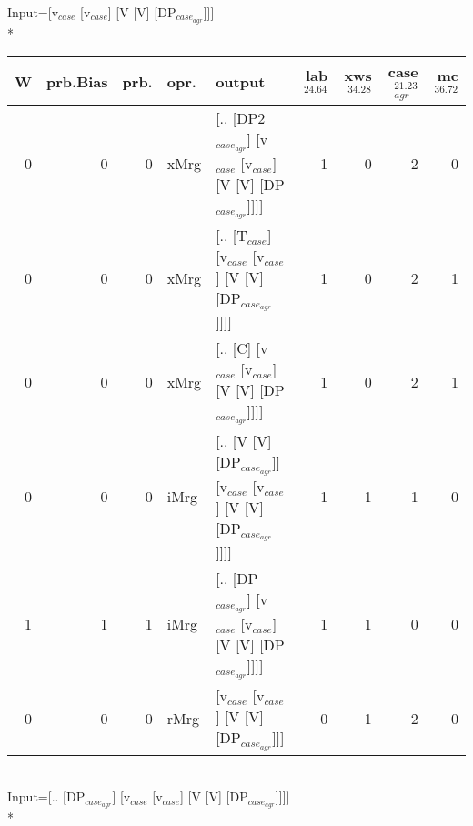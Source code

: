 \begingroup\scriptsize Input=[v$_{case}$ [v$_{case}$] [V [V] [DP$_{case_{agr}}$]]]\\*
\begin{tabularx}{\linewidth}{rrrlXrrrr}
\hline
   W &   prb.Bias &   prb. & opr.   & output                                                             &   lab$^{24.64}$ &   xws$^{34.28}$ &   case$_{agr}^{21.23}$ &   mc$^{36.72}$ \\
\hline
   0 &       0 &   0 & xMrg & [.. [DP2$_{case_{agr}}$] [v$_{case}$ [v$_{case}$] [V [V] [DP$_{case_{agr}}$]]]]        &             1 &             0 &                  2 &            0 \\
   0 &       0 &   0 & xMrg & [.. [T$_{case}$] [v$_{case}$ [v$_{case}$] [V [V] [DP$_{case_{agr}}$]]]]              &             1 &             0 &                  2 &            1 \\
   0 &       0 &   0 & xMrg & [.. [C] [v$_{case}$ [v$_{case}$] [V [V] [DP$_{case_{agr}}$]]]]                   &             1 &             0 &                  2 &            1 \\
   0 &       0 &   0 & iMrg & [.. [V [V] [DP$_{case_{agr}}$]] [v$_{case}$ [v$_{case}$] [V [V] [DP$_{case_{agr}}$]]]] &             1 &             1 &                  1 &            0 \\
   1 &       1 &   1 & iMrg & [.. [DP$_{case_{agr}}$] [v$_{case}$ [v$_{case}$] [V [V] [DP$_{case_{agr}}$]]]]         &             1 &             1 &                  0 &            0 \\
   0 &       0 &   0 & rMrg & [v$_{case}$ [v$_{case}$] [V [V] [DP$_{case_{agr}}$]]]                            &             0 &             1 &                  2 &            0 \\
\hline
\end{tabularx}\endgroup\\
\begingroup\scriptsize Input=[.. [DP$_{case_{agr}}$] [v$_{case}$ [v$_{case}$] [V [V] [DP$_{case_{agr}}$]]]]\\*
